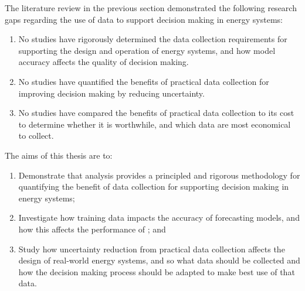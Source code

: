 
The literature review in the previous section demonstrated the following research gaps regarding the use of data to support decision making in energy systems:
\begin{enumerate}[label=\arabic*\hspace{.5ex}]
    \item No studies have rigorously determined the data collection requirements for supporting the design and operation of energy systems, and how model accuracy affects the quality of decision making.
    \item No studies have quantified the benefits of practical data collection for improving decision making by reducing uncertainty.
    \item No studies have compared the benefits of practical data collection to its cost to determine whether it is worthwhile, and which data are most economical to collect.
\end{enumerate}

\noindent The aims of this thesis are to:
\begin{enumerate}[label=\bf\arabic*\hspace{.5ex}]
    \item Demonstrate that  analysis provides a principled and rigorous methodology for quantifying the benefit of data collection for supporting decision making in energy systems;
    \item Investigate how training data impacts the accuracy of forecasting models, and how this affects the performance of ; and
    \item Study how uncertainty reduction from practical data collection affects the design of real-world energy systems, and so what data should be collected and how the decision making process should be adapted to make best use of that data.
\end{enumerate}

